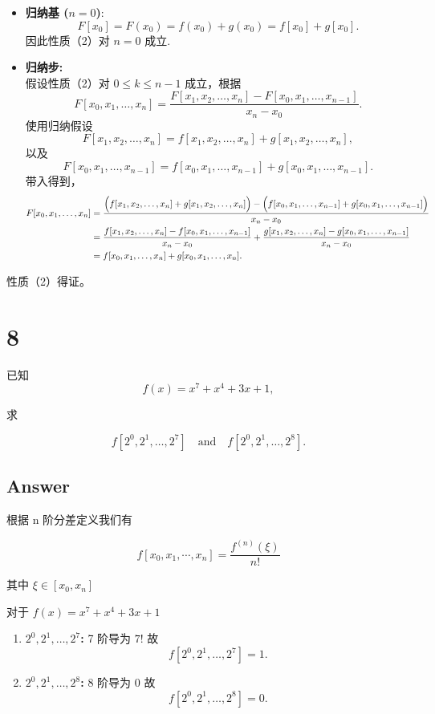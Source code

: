 \documentclass[11pt]{article}
\begin{document}
\begin{itemize}
\item
  \textbf{归纳基 (\(n=0\))}:\\
  \[
  F[x_0] = F(x_0)= f(x_0)+g(x_0)= f[x_0]+g[x_0].
  \] 因此性质（2）对 \(n=0\) 成立.
\item
  \textbf{归纳步:}\\
  假设性质（2）对 \(0\le k \le n-1\) 成立，根据 \[
  F[x_0,x_1,\dots,x_n] = \frac{F[x_1,x_2,\dots,x_n]-F[x_0,x_1,\dots,x_{n-1}]}{x_n - x_0}.
  \] 使用归纳假设 \[
  F[x_1,x_2,\dots,x_n] = f[x_1,x_2,\dots,x_n] + g[x_1,x_2,\dots,x_n],
  \] 以及 \[
  F[x_0,x_1,\dots,x_{n-1}] = f[x_0,x_1,\dots,x_{n-1}] + g[x_0,x_1,\dots,x_{n-1}].
  \] 带入得到， \[
  \begin{aligned}
  F[x_0,x_1,\dots,x_n] &= \frac{\Bigl(f[x_1,x_2,\dots,x_n] + g[x_1,x_2,\dots,x_n]\Bigr) - \Bigl(f[x_0,x_1,\dots,x_{n-1}] + g[x_0,x_1,\dots,x_{n-1}]\Bigr)}{x_n-x_0} \\
  &= \frac{f[x_1,x_2,\dots,x_n] - f[x_0,x_1,\dots,x_{n-1}]}{x_n-x_0} + \frac{g[x_1,x_2,\dots,x_n] - g[x_0,x_1,\dots,x_{n-1}]}{x_n-x_0} \\
  &= f[x_0,x_1,\dots,x_n] + g[x_0,x_1,\dots,x_n].
  \end{aligned}
  \]
\end{itemize}

性质（2）得证。

    \section{8}\label{section}

已知 \[
f(x)=x^7+x^4+3x+1,
\]

求

\[
f[2^0,2^1,\dots,2^7] \quad \text{and} \quad f[2^0,2^1,\dots,2^8].
\]

\subsection{Answer}\label{answer}

根据 n 阶分差定义我们有

\[
f[x_0, x_1, \cdots, x_n]=\frac{f^{(n)}(\xi)}{n!}
\]

其中 \(\xi \in [x_0, x_n]\)

对于 \(f(x)=x^7+x^4+3x+1\)

\begin{enumerate}
\def\labelenumi{\arabic{enumi}.}
\item
  \textbf{\(2^0,2^1,\dots,2^7\):} 7 阶导为 \(7!\) 故 \[
  f[2^0,2^1,\dots,2^7] = 1.
    \]
\item
  \textbf{\(2^0,2^1,\dots,2^8\):} 8 阶导为 \(0\) 故 \[
  f[2^0,2^1,\dots,2^8] = 0.
    \]
\end{enumerate}
\end{document}
